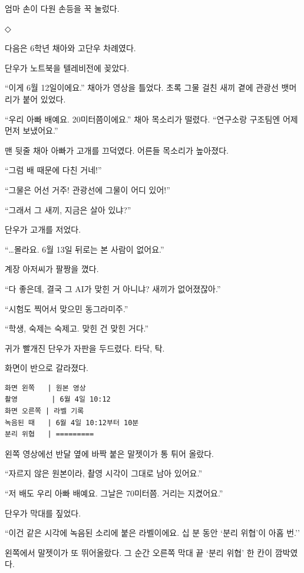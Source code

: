 \documentclass[
  korean,
  letterpaper,
  twoside,
  open=any,
  fontsize=12.5pt,
  headings=small]{scrbook}
\newcommand{\logfont}{\linespread{1}\fontsize{10.8}{15.2}\selectfont}
\begin{document}
엄마 손이 다원 손등을 꾹
눌렀다.

\begin{center}◇\end{center}\nopagebreak

다음은 6학년 채아와 고단우
차례였다.

단우가 노트북을 텔레비전에
꽂았다.

``이게 6월 12일이에요.''
채아가 영상을 틀었다. 초록
그물 걸친 새끼 곁에 관광선
뱃머리가 붙어 있었다.

``우리 아빠 배예요.
20미터쯤이에요.'' 채아
목소리가 떨렸다. ``연구소랑
구조팀엔 어제 먼저 보냈어요.''

맨 뒷줄 채아 아빠가 고개를
끄덕였다. 어른들 목소리가
높아졌다.

``그럼 배 때문에 다친 거네!''

``그물은 어선 거주! 관광선에
그물이 어디 있어!''

``그래서 그 새끼, 지금은 살아
있냐?''

단우가 고개를 저었다.

``\ldots 몰라요. 6월 13일
뒤로는 본 사람이 없어요.''

계장 아저씨가 팔짱을 꼈다.

``다 좋은데, 결국 그 AI가 맞힌
거 아니냐? 새끼가
없어졌잖아.''

``시험도 찍어서 맞으민
동그라미주.''

``학생, 숙제는 숙제고. 맞힌 건
맞힌 거다.''

귀가 빨개진 단우가 자판을
두드렸다. 타닥, 탁.

화면이 반으로 갈라졌다.

\begin{Verbatim}[samepage=true,frame=single,framesep=2.5mm,rulecolor=\color{gray},formatcom=\logfont]
화면 왼쪽   | 원본 영상
촬영        | 6월 4일 10:12
화면 오른쪽 | 라벨 기록
녹음된 때   | 6월 4일 10:12부터 10분
분리 위협   | =========
\end{Verbatim}

왼쪽 영상에선 반달 옆에 바짝
붙은 말젯이가 통 튀어 올랐다.

``자르지 않은 원본이라, 촬영
시각이 그대로 남아 있어요.''

``저 배도 우리 아빠 배예요.
그날은 70미터쯤. 거리는
지켰어요.''

단우가 막대를 짚었다.

``이건 같은 시각에 녹음된
소리에 붙은 라벨이에요. 십 분
동안 `분리 위협'이 아홉 번.''

왼쪽에서 말젯이가 또
뛰어올랐다. 그 순간 오른쪽
막대 끝 `분리 위협' 한 칸이
깜박였다.
\end{document}

